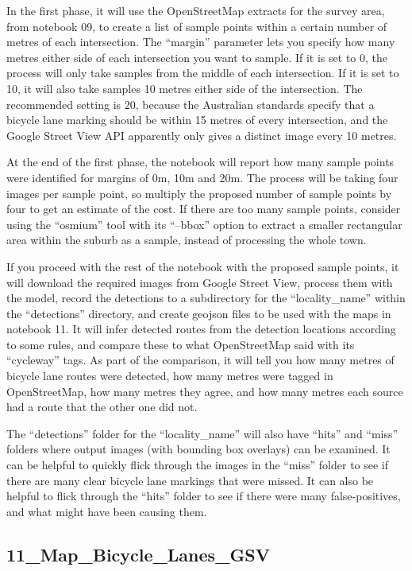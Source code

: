 \documentclass[11pt,twoside]{report}
\begin{document}
In the first phase, it will use the OpenStreetMap extracts for the survey area, from notebook 09, to create a list of sample points within a certain number of metres of each intersection.  The ``margin'' parameter lets you specify how many metres either side of each intersection you want to sample.  If it is set to 0, the process will only take samples from the middle of each intersection.  If it is set to 10, it will also take samples 10 metres either side of the intersection.  The recommended setting is 20, because the Australian standards specify that a bicycle lane marking should be within 15 metres of every intersection, and the Google Street View API apparently only gives a distinct image every 10 metres.

At the end of the first phase, the notebook will report how many sample points were identified for margins of 0m, 10m and 20m.  The process will be taking four images per sample point, so multiply the proposed number of sample points by four to get an estimate of the cost.  If there are too many sample points, consider using the ``osmium'' tool with its ``--bbox'' option to extract a smaller rectangular area within the suburb as a sample, instead of processing the whole town.

If you proceed with the rest of the notebook with the proposed sample points, it will download the required images from Google Street View, process them with the model, record the detections to a subdirectory for the ``locality\_name'' within the ``detections'' directory, and create geojson files to be used with the maps in notebook 11.  It will infer detected routes from the detection locations according to some rules, and compare these to what OpenStreetMap said with its ``cycleway'' tags.  As part of the comparison, it will tell you how many metres of bicycle lane routes were detected, how many metres were tagged in OpenStreetMap, how many metres they agree, and how many metres each source had a route that the other one did not.

The ``detections'' folder for the ``locality\_name'' will also have ``hits'' and ``miss'' folders where output images (with bounding box overlays) can be examined.  It can be helpful to quickly flick through the images in the ``miss'' folder to see if there are many clear bicycle lane markings that were missed.  It can also be helpful to flick through the ``hits'' folder to see if there were many false-positives, and what might have been causing them.


\subsection{11\_Map\_Bicycle\_Lanes\_GSV}
\label{a11}
\end{document}

